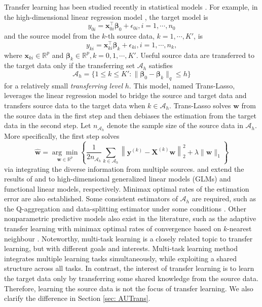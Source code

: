 \documentclass[twoside,12pt]{article}
\newcommand{\mb}[1]{\boldsymbol{\mathbf{#1}}}
\begin{document}
	Transfer learning has been studied recently in statistical models \citep{bastani2021predicting,Li2022, tian2022transfer, lin2022transfer}.
	For example, in the high-dimensional linear regression model \citep{Li2022}, the target model is
	$$y_{0i}=\mb x_{0i}^\top \mb\beta_0+\epsilon_{0i}, i=1,\cdots, n_0$$
	and the source model from the $k$-th source data, $k=1,\cdots,K'$, is 
	$$y_{ki}=\mb x_{ki}^\top \mb\beta_k+\epsilon_{ki}, i=1,\cdots, n_k,$$
	where $\mb x_{ki}\in\mathbb{R}^{p}$ and $\mb\beta_k\in\mathbb{R}^{p}, k=0,1,\cdots,K'$.
	Useful source data are transferred to the target data only if the transferring set $\mathcal{A}_h$ satisfies
	$$\mathcal{A}_h=\{1\leq k\leq K': \|\mb\beta_0-\mb\beta_k\|_q\leq h\}$$
	for a relatively small \textit{transferring level} $h$.
	This model, named Trans-Lasso, leverages the linear regression model to bridge the source and target data and transfers source data to the target data when $k\in\mathcal{A}_h$.
	Trans-Lasso solves $\mb w$ from the source data in the first step and then debiases the estimation from the target data in the second step.
	Let $n_{\mathcal{A}_h}$ denote the sample size of the source data in $\mathcal{A}_h$.
	More specifically, the first step solves 
	$$\hat{\mb w}=\underset{\mb w \in \mathbb{R}^{p}}{\arg \min }\left\{\frac{1}{2n_{\mathcal{A}_h}} \sum_{k \in \mathcal{A}_h}\left\|\mb y^{(k)}-\mb X^{(k)} \mb w\right\|_{2}^{2}+\lambda\|\mb w\|_{1}\right\}$$
	via integrating the diverse information from multiple sources.
	\cite{tian2022transfer} and \cite{lin2022transfer} extend the results of \cite{bastani2021predicting} and \cite{Li2022} to high-dimensional generalized linear models (GLMs) and functional linear models, respectively. 
	Minimax optimal rates of the estimation error are also established.
	Some consistent estimators of $\mathcal{A}_h$ are required, such as the Q-aggregation \citep{Li2022} and data-splitting estimator under some conditions \citep{tian2022transfer}.
	Other nonparametric predictive models also exist in the literature, such as the adaptive transfer learning with minimax optimal rates of convergence based on $k$-nearest neighbour \citep{cai2021transfer, reeve2021adaptive}.
	Noteworthy, multi-task learning is a closely related topic to transfer learning, but with different goals and interests.
	Multi-task learning method integrates multiple learning tasks simultaneously, while exploiting a shared structure across all tasks.
	In contrast, the interest of transfer learning is to learn the target data only by transferring some shared knowledge from the source data.
	Therefore, learning the source data is not the focus of transfer learning.
 We also clarify the difference in Section \ref{sec: AUTrans}.
	
\end{document}
